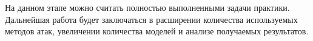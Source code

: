 На данном этапе можно считать полностью выполненными задачи практики.
Дальнейшая работа будет заключаться в расширении количества используемых методов атак, увеличении количества моделей и анализе получаемых результатов.
